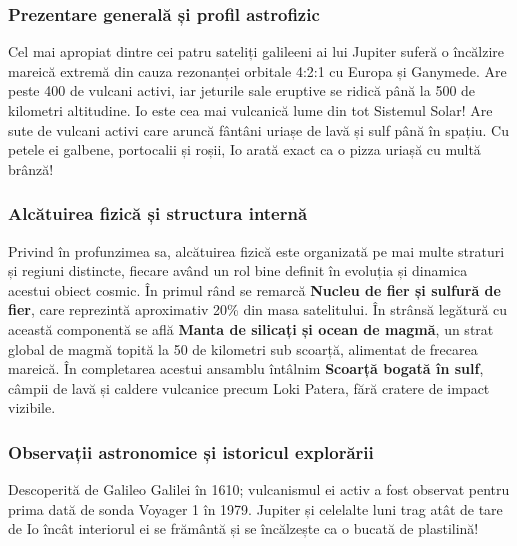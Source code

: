 \subsubsection*{Prezentare generală și profil astrofizic}
Cel mai apropiat dintre cei patru sateliți galileeni ai lui Jupiter suferă o încălzire mareică extremă din cauza rezonanței orbitale 4:2:1 cu Europa și Ganymede. Are peste 400 de vulcani activi, iar jeturile sale eruptive se ridică până la 500 de kilometri altitudine. Io este cea mai vulcanică lume din tot Sistemul Solar! Are sute de vulcani activi care aruncă fântâni uriașe de lavă și sulf până în spațiu. Cu petele ei galbene, portocalii și roșii, Io arată exact ca o pizza uriașă cu multă brânză!

\subsubsection*{Alcătuirea fizică și structura internă}
Privind în profunzimea sa, alcătuirea fizică este organizată pe mai multe straturi și regiuni distincte, fiecare având un rol bine definit în evoluția și dinamica acestui obiect cosmic. În primul rând se remarcă \textbf{Nucleu de fier și sulfură de fier}, care reprezintă aproximativ 20\% din masa satelitului. În strânsă legătură cu această componentă se află \textbf{Manta de silicați și ocean de magmă}, un strat global de magmă topită la 50 de kilometri sub scoarță, alimentat de frecarea mareică. În completarea acestui ansamblu întâlnim \textbf{Scoarță bogată în sulf}, câmpii de lavă și caldere vulcanice precum Loki Patera, fără cratere de impact vizibile.

\subsubsection*{Observații astronomice și istoricul explorării}
Descoperită de Galileo Galilei în 1610; vulcanismul ei activ a fost observat pentru prima dată de sonda Voyager 1 în 1979. Jupiter și celelalte luni trag atât de tare de Io încât interiorul ei se frământă și se încălzește ca o bucată de plastilină!

